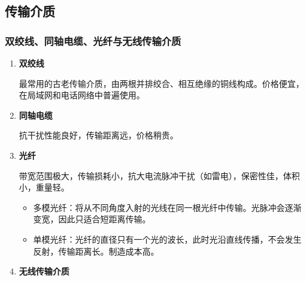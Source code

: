 \documentclass[12pt, a4paper, oneside]{ctexart}
\begin{document}
\begin{table}
    \caption{数据报和虚电路的比较}
    \label{comp-between-datagram-and-virtual}
\end{table}

\subsection{传输介质}

\subsubsection{双绞线、同轴电缆、光纤与无线传输介质}

\begin{enumerate}
    \item {\bf 双绞线}
    
    最常用的古老传输介质，由两根并排绞合、相互绝缘的铜线构成。价格便宜，在局域网和电话网络中普遍使用。
    \item {\bf 同轴电缆}
    
    抗干扰性能良好，传输距离远，价格稍贵。
    \item {\bf 光纤}
    
    带宽范围极大，传输损耗小，抗大电流脉冲干扰（如雷电），保密性佳，体积小，重量轻。
    \begin{itemize}
        \item 多模光纤：将从不同角度入射的光线在同一根光纤中传输。光脉冲会逐渐变宽，因此只适合短距离传输。
        \item 单模光纤：光纤的直径只有一个光的波长，此时光沿直线传播，不会发生反射，传输距离长。制造成本高。
    \end{itemize}
    \item {\bf 无线传输介质}
\end{enumerate}
\end{document}
